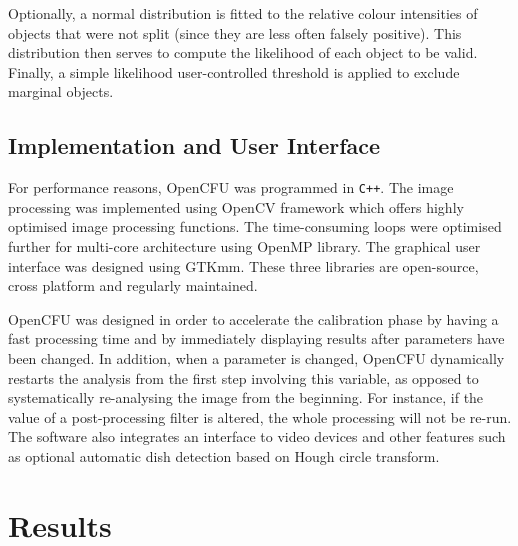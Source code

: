\documentclass[10pt]{article}
\begin{document}
Optionally, a normal distribution is fitted to the relative colour intensities of
objects that were not split (since they are less often falsely positive). This
distribution then serves to compute the likelihood of each object to be valid.
Finally, a simple likelihood user-controlled threshold is applied to exclude
marginal objects.


 \subsection*{Implementation and User Interface} For performance reasons, OpenCFU was
programmed in \texttt{C++}. The image processing was implemented using OpenCV framework\cite{opencv_library}
 which offers highly optimised image processing functions.
The time-consuming loops were optimised further for multi-core architecture using
OpenMP library\cite{openmp11}. The graphical user interface was designed using GTKmm.
These three libraries are open-source, cross platform and regularly maintained.

OpenCFU was designed in order to accelerate the calibration phase by having a
fast processing time and by immediately displaying results after parameters have
been changed. In addition, when a parameter is changed, OpenCFU dynamically restarts the analysis from
the first step involving this variable, as opposed to systematically re-analysing the image
from 
the beginning. For instance, if the value of a post-processing filter is altered, the whole processing will not be re-run.
The software also integrates an interface to video
devices and
other features such as optional
automatic dish detection based on Hough circle transform.


\section*{Results}
\end{document}
